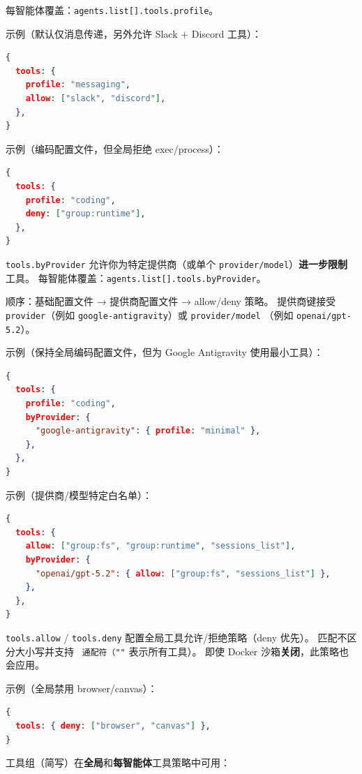 每智能体覆盖：\texttt{agents.list[].tools.profile}。

示例（默认仅消息传递，另外允许 Slack + Discord 工具）：

\begin{lstlisting}[language=json]
{
  tools: {
    profile: "messaging",
    allow: ["slack", "discord"],
  },
}
\end{lstlisting}


示例（编码配置文件，但全局拒绝 exec/process）：

\begin{lstlisting}[language=json]
{
  tools: {
    profile: "coding",
    deny: ["group:runtime"],
  },
}
\end{lstlisting}


\texttt{tools.byProvider} 允许你为特定提供商（或单个 \texttt{provider/model}）\textbf{进一步限制}工具。
每智能体覆盖：\texttt{agents.list[].tools.byProvider}。

顺序：基础配置文件 → 提供商配置文件 → allow/deny 策略。
提供商键接受 \texttt{provider}（例如 \texttt{google-antigravity}）或 \texttt{provider/model}
（例如 \texttt{openai/gpt-5.2}）。

示例（保持全局编码配置文件，但为 Google Antigravity 使用最小工具）：

\begin{lstlisting}[language=json]
{
  tools: {
    profile: "coding",
    byProvider: {
      "google-antigravity": { profile: "minimal" },
    },
  },
}
\end{lstlisting}


示例（提供商/模型特定白名单）：

\begin{lstlisting}[language=json]
{
  tools: {
    allow: ["group:fs", "group:runtime", "sessions_list"],
    byProvider: {
      "openai/gpt-5.2": { allow: ["group:fs", "sessions_list"] },
    },
  },
}
\end{lstlisting}


\texttt{tools.allow} / \texttt{tools.deny} 配置全局工具允许/拒绝策略（deny 优先）。
匹配不区分大小写并支持 \texttt{\textit{} 通配符（\texttt{"}"} 表示所有工具）。
即使 Docker 沙箱\textbf{关闭}，此策略也会应用。

示例（全局禁用 browser/canvas）：

\begin{lstlisting}[language=json]
{
  tools: { deny: ["browser", "canvas"] },
}
\end{lstlisting}


工具组（简写）在\textbf{全局}和\textbf{每智能体}工具策略中可用：


